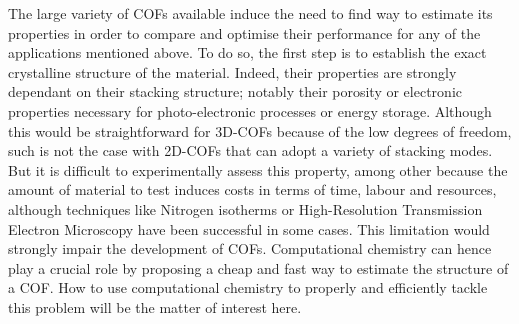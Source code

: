 The large variety of COFs available induce the need to find way to estimate its properties in order to compare and optimise their performance for any of the applications mentioned above. To do so, the first step is to establish the exact crystalline structure of the material. Indeed, their properties are strongly dependant on their stacking structure; notably their porosity or electronic properties \cite{xu_dependence_2016} necessary for photo-electronic processes or energy storage. Although this would be straightforward for 3D-COFs because of the low degrees of freedom, such is not the case with 2D-COFs that can adopt a variety of stacking modes. But it is difficult to experimentally assess this property, among other because the amount of material to test induces costs in terms of time, labour and resources, although techniques like Nitrogen isotherms or High-Resolution Transmission Electron Microscopy have been successful in some cases. This limitation would strongly impair the development of COFs. Computational chemistry can hence play a crucial role by proposing a cheap and fast way to estimate the structure of a COF. How to use computational chemistry to properly and efficiently tackle this problem will be the matter of interest here.






